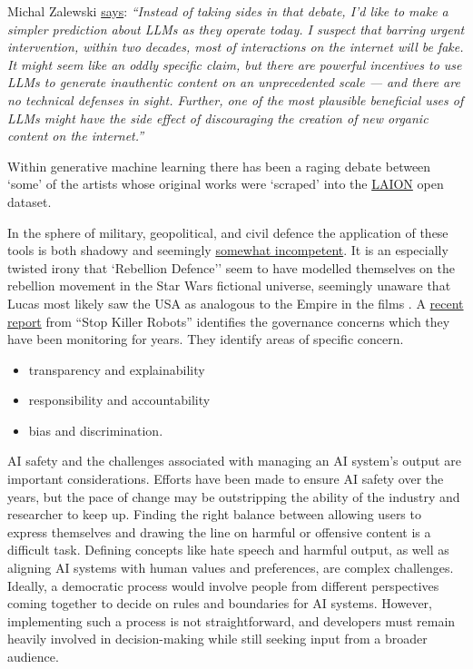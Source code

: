 Michal Zalewski \href{https://lcamtuf.substack.com/p/llms-a-bleak-future-ahead}{says}: \textit{``Instead of taking sides in that debate, I’d like to make a simpler prediction about LLMs as they operate today. I suspect that barring urgent intervention, within two decades, most of interactions on the internet will be fake. It might seem like an oddly specific claim, but there are powerful incentives to use LLMs to generate inauthentic content on an unprecedented scale — and there are no technical defenses in sight. Further, one of the most plausible beneficial uses of LLMs might have the side effect of discouraging the creation of new organic content on the internet.''}

Within generative machine learning there has been a raging debate between `some' of the artists whose original works were `scraped' into the \href{https://laion.ai/}{LAION} open dataset. \par
In the sphere of military, geopolitical, and civil defence the application of these tools is both shadowy and seemingly \href{https://www.vox.com/recode/23507236/inside-disruption-rebellion-defense-washington-connected-military-tech-startup}{somewhat incompetent}. It is an especially twisted irony that `Rebellion Defence'' seem to have modelled themselves on the rebellion movement in the Star Wars fictional universe, seemingly unaware that Lucas most likely saw the USA as analogous to the Empire in the films \cite{immerwahr202221}. A \href{https://www.stopkillerrobots.org/wp-content/uploads/2022/10/ADR-Artificial-intelligence-and-automated-decisions-Single-View.pdf}{recent report} from ``Stop Killer Robots'' identifies the governance concerns which they have been monitoring for years. They identify areas of specific concern.
\begin{itemize}
\item transparency and explainability \item responsibility and  accountability
\item bias and discrimination.
\end{itemize}
AI safety and the challenges associated with managing an AI system's output are important considerations. Efforts have been made to ensure AI safety over the years, but the pace of change may be outstripping the ability of the industry and researcher to keep up. Finding the right balance between allowing users to express themselves and drawing the line on harmful or offensive content is a difficult task. Defining concepts like hate speech and harmful output, as well as aligning AI systems with human values and preferences, are complex challenges. Ideally, a democratic process would involve people from different perspectives coming together to decide on rules and boundaries for AI systems. However, implementing such a process is not straightforward, and developers must remain heavily involved in decision-making while still seeking input from a broader audience.\par
